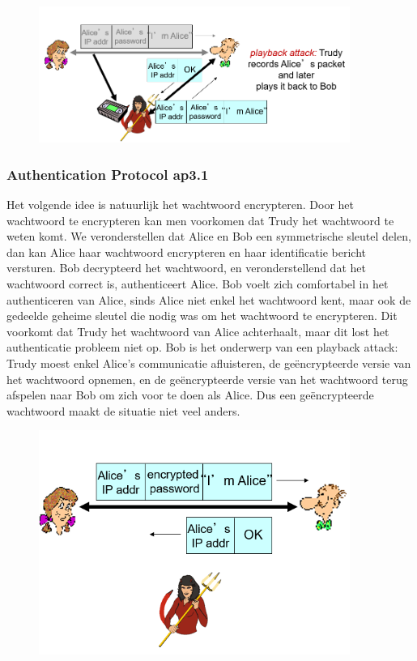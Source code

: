 \begin{figure}[h]
    \centering
    \includegraphics[width=4in]{./img/imghfdst8/hfdst8puntje17.png}
    \caption{ }      
    \label{fig: }
\end{figure}

\clearpage

\subsubsection{Authentication Protocol ap3.1}

Het volgende idee is natuurlijk het wachtwoord encrypteren. Door het wachtwoord te encrypteren kan men voorkomen dat Trudy het wachtwoord te weten komt. We veronderstellen dat Alice en Bob een symmetrische sleutel delen, dan kan Alice haar wachtwoord encrypteren en haar identificatie bericht versturen. Bob decrypteerd het wachtwoord, en veronderstellend dat het wachtwoord correct is, authenticeert Alice. Bob voelt zich comfortabel in het authenticeren van Alice, sinds Alice niet enkel het wachtwoord kent, maar ook de gedeelde geheime sleutel die nodig was om het wachtwoord te encrypteren.
Dit voorkomt dat Trudy het wachtwoord van Alice achterhaalt, maar dit lost het authenticatie probleem niet op. Bob is het onderwerp van een playback attack: Trudy moest enkel Alice’s communicatie afluisteren, de geëncrypteerde versie van het wachtwoord opnemen, en de geëncrypteerde versie van het wachtwoord terug afspelen naar Bob om zich voor te doen als Alice. Dus een geëncrypteerde wachtwoord maakt de situatie niet veel anders.

\begin{figure}[h]
    \centering
    \includegraphics[width=4in]{./img/imghfdst8/hfdst8puntje18.png}
    \caption{ }      
    \label{fig: }
\end{figure}

